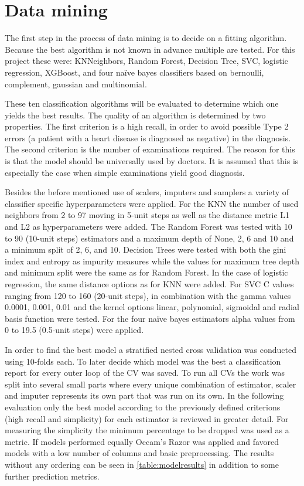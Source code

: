 \section{Data mining} \label{sec:datamining}
The first step in the process of data mining is to decide on a fitting algorithm. Because the best algorithm is not known in advance multiple are tested. For this project these were: KNNeighbors, Random Forest, Decision Tree, SVC, logistic regression, XGBoost, and four naïve bayes classifiers based on bernoulli, complement, gaussian  and multinomial.

These ten classification algorithms will be evaluated to determine which one yields the best results. The quality of an algorithm is determined by two properties. The first criterion is a high recall, in order to avoid possible Type 2 errors (a patient with a heart disease is diagnosed as negative) in the diagnosis. The second criterion is the number of examinations required. The reason for this is that the model should be universally used by doctors. It is assumed that this is especially the case when simple examinations yield good diagnosis.

Besides the before mentioned use of scalers, imputers and samplers a variety of classifier specific hyperparameters were applied. For the KNN the number of used neighbors from 2 to 97 moving in 5-unit steps as well as the distance metric L1 and L2 as hyperparameters were added. The Random Forest was tested with 10 to 90 (10-unit steps) estimators and a maximum depth of None, 2, 6 and 10 and a minimum split of 2, 6, and 10. Decision Trees were tested with both the gini index and entropy as impurity measures while the values for maximum tree depth and minimum split were the same as for Random Forest. In the case of logistic regression, the same distance options as for KNN were added. For SVC C values ranging from 120 to 160 (20-unit steps), in combination with the gamma values 0.0001, 0.001, 0.01 and the kernel options linear, polynomial, sigmoidal and radial basis function were tested. For the four naïve bayes estimators alpha values from 0 to 19.5 (0.5-unit steps) were applied.

In order to find the best model a stratified nested cross validation was conducted using 10-folds each. To later decide which model was the best a classification report for every outer loop of the CV was saved. To run all CVs the work was split into several small parts where every unique combination of estimator, scaler and imputer represents its own part that was run on its own. In the following evaluation only the best model according to the previously defined criterions (high recall and simplicity) for each estimator is reviewed in greater detail. For measuring the simplicity the minimum percentage to be dropped was used as a metric. If models performed equally Occam's Razor was applied and favored models with a low number of columns and basic preprocessing. The results without any ordering can be seen in \cref{table:modelresults} in addition to some further prediction metrics.


